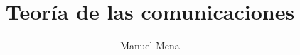 \documentclass[a4paper]{article}
\theoremstyle{remark}
\theoremstyle{definition}
\theoremstyle{plain}
\begin{document}
\title{Teoría de las comunicaciones}
\author{Manuel Mena}
\maketitle

\tableofcontents

\newpage


\newpage


\newpage

\end{document}
